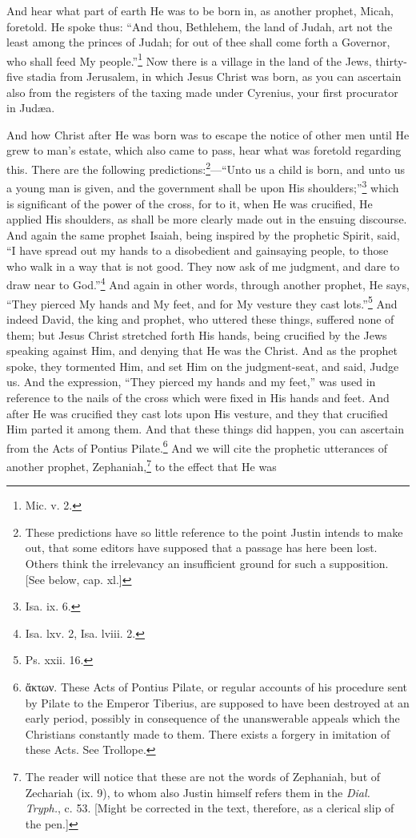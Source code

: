 
And hear what part of earth He was to be born in, as another prophet, Micah, foretold. He spoke thus: “And thou, Bethlehem, the land of Judah, art not the least among the princes of Judah; for out of thee shall come forth a Governor, who shall feed My people.”\footnote{Mic. v. 2.} Now there is a village in the land of the Jews, thirty-five stadia from Jerusalem, in which Jesus Christ was born, as you can ascertain also from the registers of the taxing made under Cyrenius, your first procurator in Judæa.


And how Christ after He was born was to escape the notice of other men until He grew to man’s estate, which also came to pass, hear what was foretold regarding this. There are the following predictions:\footnote{These predictions have so little reference to the point Justin intends to make out, that some editors have supposed that a passage has here been lost. Others think the irrelevancy an insufficient ground for such a supposition. [See below, cap. xl.]}—“Unto us a child is born, and unto us a young man is given, and the government shall be upon His shoulders;”\footnote{Isa. ix. 6.} which is significant of the power of the cross, for to it, when He was crucified, He applied His shoulders, as shall be more clearly made out in the ensuing discourse. And again the same prophet Isaiah, being inspired by the prophetic Spirit, said, “I have spread out my hands to a disobedient and gainsaying people, to those who walk in a way that is not good. They now ask of me judgment, and dare to draw near to God.”\footnote{Isa. lxv. 2, Isa. lviii. 2.} And again in other words, through another prophet, He says, “They pierced My hands and My feet, and for My vesture they cast lots.”\footnote{Ps. xxii. 16.} And indeed David, the king and prophet, who uttered these things, suffered none of them; but Jesus Christ stretched forth His hands, being crucified by the Jews speaking against Him, and denying that He was the Christ. And as the prophet spoke, they tormented Him, and set Him on the judgment-seat, and said, Judge us. And the expression, “They pierced my hands and my feet,” was used in reference to the nails of the cross which were fixed in His hands and feet. And after He was crucified they cast lots upon His vesture, and they  that crucified Him parted it among them. And that these things did happen, you can ascertain from the Acts of Pontius Pilate.\footnote{\textgreek{ἄκτων}. These Acts of Pontius Pilate, or regular accounts of his procedure sent by Pilate to the Emperor Tiberius, are supposed to have been destroyed at an early period, possibly in consequence of the unanswerable appeals which the Christians constantly made to them. There exists a forgery in imitation of these Acts. See Trollope.} And we will cite the prophetic utterances of another prophet, Zephaniah,\footnote{The reader will notice that these are not the words of Zephaniah, but of Zechariah (ix. 9), to whom also Justin himself refers them in the \emph{Dial. Tryph.}, c. 53. [Might be corrected in the text, therefore, as a clerical slip of the pen.]} to the effect that He was 